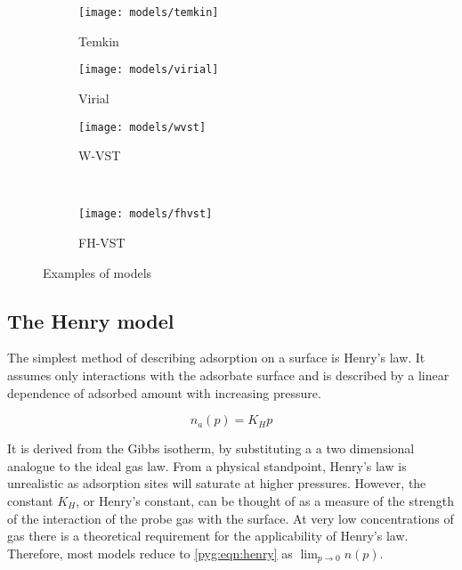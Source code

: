 \begin{figure}[p]
\begin{subfigure}{0.3\linewidth}
		\parbox[c]{1.0\linewidth}{\caption{Temkin}%
			\label{pyg:fgr:temkinex}}

		\parbox[b]{1.0\linewidth}{%

			\texttt{[image: models/temkin]}}
	\end{subfigure}%
	\begin{subfigure}{0.3\linewidth}

		\parbox[c]{1.0\linewidth}{\caption{Virial}%
			\label{pyg:fgr:virialex}}

		\parbox[b]{1.0\linewidth}{%

			\texttt{[image: models/virial]}}
	\end{subfigure}%
	\begin{subfigure}{0.3\linewidth}

		\parbox[c]{1.0\linewidth}{\caption{W-VST}%
			\label{pyg:fgr:wsvstex}}

		\parbox[b]{1.0\linewidth}{%

			\texttt{[image: models/wvst]}}
	\end{subfigure}%
	\\
	\begin{subfigure}{0.3\linewidth}

		\parbox[c]{1.0\linewidth}{\caption{FH-VST}%
			\label{pyg:fgr:fhvstex}}

		\parbox[b]{1.0\linewidth}{%

			\texttt{[image: models/fhvst]}}
	\end{subfigure}%

	\caption{Examples of models
	}%
	\label{pyg:fgr:modelex}
\end{figure}

\subsection{The Henry model}\label{pyg:models:henry}

The simplest method of describing adsorption on a
surface is Henry’s law. It assumes only interactions
with the adsorbate surface and is described by a
linear dependence of adsorbed amount with
increasing pressure.

\begin{equation}\label{pyg:eqn:henry}
	n_a(p) = K_H p
\end{equation}

It is derived from the Gibbs isotherm, by substituting a
a two dimensional analogue to the ideal gas law.
From a physical standpoint, Henry's law is unrealistic as adsorption sites
will saturate at higher pressures. However, the constant \(K_H\),
or Henry’s constant, can be thought of as a measure of the strength
of the interaction of the probe gas with the surface. At very
low concentrations of gas there is a
theoretical requirement for the applicability of Henry's law.
Therefore, most models reduce to \autoref{pyg:eqn:henry}
as \(\lim_{p \to 0} n(p)\).

